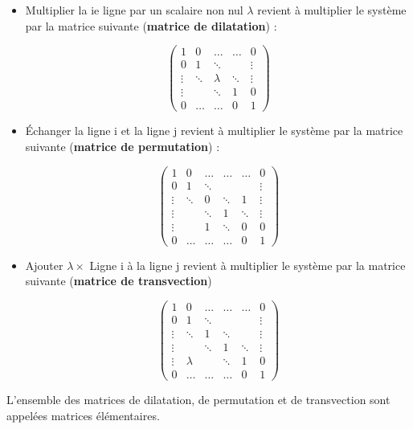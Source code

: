 \documentclass[12pt]{article}
\theoremstyle{break}
\begin{document}
\begin{itemize}[noitemsep,topsep=0pt]
  \item Multiplier la ie ligne par un scalaire non nul $\lambda$ revient à multiplier le système par la matrice suivante (\textbf{matrice de dilatation}) :

$$
\left(\begin{array}{ccccc}
1 & 0 & \ldots & \ldots & 0 \\
0 & 1 & \ddots & & \vdots \\
\vdots & \ddots & \lambda & \ddots & \vdots \\
\vdots & & \ddots & 1 & 0 \\
0 & \ldots & \ldots & 0 & 1
\end{array}\right)
$$

  \item Échanger la ligne i et la ligne j revient à multiplier le système par la matrice suivante (\textbf{matrice de permutation}) :

$$
\left(\begin{array}{cccccc}
1 & 0 & \ldots & \ldots & \ldots & 0 \\
0 & 1 & \ddots & & & \vdots \\
\vdots & \ddots & 0 & \ddots & 1 & \vdots \\
\vdots & & \ddots & 1 & \ddots & \vdots \\
\vdots & & 1 & \ddots & 0 & 0 \\
0 & \ldots & \ldots & \ldots & 0 & 1
\end{array}\right)
$$

  \item Ajouter $\lambda \times$ Ligne i à la ligne j revient à multiplier le système par la matrice suivante (\textbf{matrice de transvection})

$$
\left(\begin{array}{cccccc}
1 & 0 & \ldots & \ldots & \ldots & 0 \\
0 & 1 & \ddots & & & \vdots \\
\vdots & \ddots & 1 & \ddots & & \vdots \\
\vdots & & \ddots & 1 & \ddots & \vdots \\
\vdots & \lambda & & \ddots & 1 & 0 \\
0 & \ldots & \ldots & \ldots & 0 & 1
\end{array}\right)
$$
\end{itemize}

\begin{definition}{}{}
L'ensemble des matrices de dilatation, de permutation et de transvection sont appelées matrices élémentaires.
\end{definition}
\end{document}
